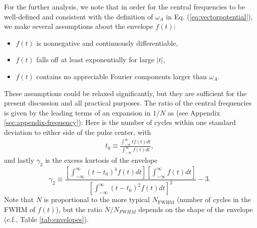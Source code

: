 For the further analysis, we note that in order for the central frequencies to be well-defined and consistent with the definition of $\omega_A$ in Eq. (\ref{eq:vectorpotential}), we make several assumptions about the envelope $f(t)$:
\begin{itemize}
  \item $f(t)$ is nonnegative and continuously differentiable,
  \item $f(t)$ falls off at least exponentially for large $|t|$, 
\item $f(t)$ contains no appreciable Fourier components larger than $\omega_A$.
\end{itemize}
These assumptions could be relaxed significantly, but they are sufficient for the present discussion and all practical purposes. The ratio of the central frequencies is given by the leading terms of an expansion in $1/N$ as (see Appendix \ref{sec:appendix-frequency}):
%
Here
%
%
is the number of cycles within one standard deviation to either side of the pulse center, with
%
\begin{equation}
\begin{split}
t_0 \equiv \frac{\int_{-\infty}^{\infty} t f(t) dt}{\int_{-\infty}^{\infty} f(t) dt},
\end{split}
\end{equation}
%
and lastly $\gamma_2$ is the excess kurtosis of the envelope
%
\begin{equation}
\label{eq:gamma2}
\gamma_2 \equiv \frac{\left[\int_{-\infty}^{\infty} (t-t_0)^4 f(t) dt\right]\left[\int_{-\infty}^{\infty} f(t) dt\right]}{\left[\int_{-\infty}^{\infty} (t-t_0)^2 f(t) dt\right]^2}-3.
\end{equation}
%
Note that $N$ is proportional to the more typical $N_{\text{FWHM}}$ (number of cycles in the FWHM of $f(t)$), but the ratio $N/N_{FWHM}$ depends on the shape of the envelope (c.f., Table \ref{tab:envelopes}). 

